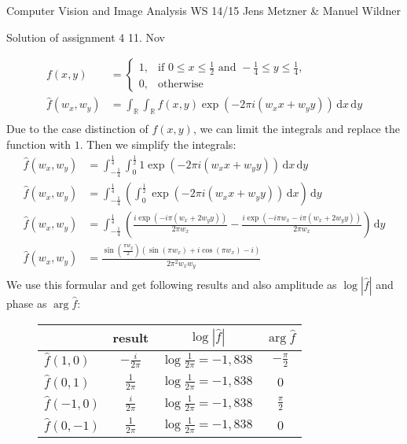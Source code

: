 \documentclass[10pt,a4paper]{scrartcl}
\newcommand{\R}{\mathbb{R}}
\newcommand{\der}{\,\mathrm{d}}
\begin{document}
\uebkopfzeile
  {Computer Vision and Image Analysis} %
  {WS 14/15}  %
  {}    %
  {Jens Metzner \& Manuel Wildner}    %

\uebtitel
{Solution of assignment 4} %
{11. Nov} %



\begin{align*}
f(x,y) &= \left\{\begin{array}{cl} 1, & \mbox{if }0 \leq x \leq \frac{1}{2} \mbox{ and } -\frac{1}{4} \leq y \leq \frac{1}{4},\\ 0, & \mbox{otherwise} \end{array}\right.\\
%
\hat f(w_x,w_y) &= \int_\R \int_\R f(x,y) \exp{\left(-2\pi i(w_xx+w_yy)\right)}\der x \der y\\
\end{align*}
Due to the case distinction of $f(x,y)$, we can limit the integrals and replace the function with $1$. Then we simplify the integrals:
\begin{align*}
\hat f(w_x,w_y) &= \int_{-\frac{1}{4}}^\frac{1}{4} \int_0^\frac{1}{2} 1 \exp{\left(-2\pi i(w_xx+w_yy)\right)}\der x \der y\\
%
\hat f(w_x,w_y) &= \int_{-\frac{1}{4}}^\frac{1}{4} \left(\int_0^\frac{1}{2} \exp{\left(-2\pi i(w_xx+w_yy)\right)}\der x \right)\der y\\
%
\hat f(w_x,w_y) &= \int_{-\frac{1}{4}}^\frac{1}{4} \left(\frac{i\exp{\left(-i\pi (w_x+2w_yy)\right)}}{2\pi w_x} - \frac{i\exp{\left(-i\pi w_x-i\pi(w_x+2w_yy)\right)}}{2\pi w_x}\right)\der y\\
%
\hat f(w_x,w_y) &= \frac{\sin{\left(\frac{\pi w_y}{2}\right)} \left(\sin{(\pi w_x)} + i \cos{(\pi w_x)} - i\right)}{2 \pi^2 w_x w_y}\\
\end{align*}
We use this formular and get following results and also amplitude as $\log|\hat f|$ and phase as $\arg{\hat f}$:
\begin{figure}[h]
\center
\renewcommand\arraystretch{1.5}%
\begin{tabular}{l|ccc}
 & result & $\log|\hat f|$ & $\arg{\hat f}$\\\hline
$\hat f(1,0)$ & $-\frac{i}{2\pi}$ & $\log\frac{1}{2\pi} = -1,838$ & $-\frac{\pi}{2}$ \\
$\hat f(0,1)$ & $\frac{1}{2\pi}$ & $\log\frac{1}{2\pi} = -1,838$ & 0 \\
$\hat f(-1,0)$ & $\frac{i}{2\pi}$ & $\log\frac{1}{2\pi} = -1,838$ & $\frac{\pi}{2}$ \\
$\hat f(0,-1)$ & $\frac{1}{2\pi}$ & $\log\frac{1}{2\pi} = -1,838$ & 0 \\
\end{tabular}
\end{figure}
\end{document}
